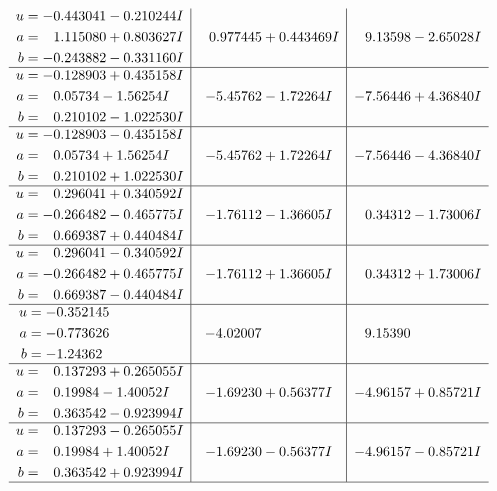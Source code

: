 \documentclass[1p]{elsarticle_modified}
\theoremstyle{definition}
\begin{document}
$$\begin{array}{c|c|c}
\begin{aligned}
u &= -0.443041 - 0.210244 I \\
a &= \phantom{-}1.115080 + 0.803627 I \\
b &= -0.243882 - 0.331160 I\end{aligned}
 & \phantom{-}0.977445 + 0.443469 I & \phantom{-}9.13598 - 2.65028 I \\ \hline\begin{aligned}
u &= -0.128903 + 0.435158 I \\
a &= \phantom{-}0.05734 - 1.56254 I \\
b &= \phantom{-}0.210102 - 1.022530 I\end{aligned}
 & -5.45762 - 1.72264 I & -7.56446 + 4.36840 I \\ \hline\begin{aligned}
u &= -0.128903 - 0.435158 I \\
a &= \phantom{-}0.05734 + 1.56254 I \\
b &= \phantom{-}0.210102 + 1.022530 I\end{aligned}
 & -5.45762 + 1.72264 I & -7.56446 - 4.36840 I \\ \hline\begin{aligned}
u &= \phantom{-}0.296041 + 0.340592 I \\
a &= -0.266482 - 0.465775 I \\
b &= \phantom{-}0.669387 + 0.440484 I\end{aligned}
 & -1.76112 - 1.36605 I & \phantom{-}0.34312 - 1.73006 I \\ \hline\begin{aligned}
u &= \phantom{-}0.296041 - 0.340592 I \\
a &= -0.266482 + 0.465775 I \\
b &= \phantom{-}0.669387 - 0.440484 I\end{aligned}
 & -1.76112 + 1.36605 I & \phantom{-}0.34312 + 1.73006 I \\ \hline\begin{aligned}
u &= -0.352145\phantom{ +0.000000I} \\
a &= -0.773626\phantom{ +0.000000I} \\
b &= -1.24362\phantom{ +0.000000I}\end{aligned}
 & -4.02007\phantom{ +0.000000I} & \phantom{-}9.15390\phantom{ +0.000000I} \\ \hline\begin{aligned}
u &= \phantom{-}0.137293 + 0.265055 I \\
a &= \phantom{-}0.19984 - 1.40052 I \\
b &= \phantom{-}0.363542 - 0.923994 I\end{aligned}
 & -1.69230 + 0.56377 I & -4.96157 + 0.85721 I \\ \hline\begin{aligned}
u &= \phantom{-}0.137293 - 0.265055 I \\
a &= \phantom{-}0.19984 + 1.40052 I \\
b &= \phantom{-}0.363542 + 0.923994 I\end{aligned}
 & -1.69230 - 0.56377 I & -4.96157 - 0.85721 I\\
 \hline 
 \end{array}$$\newpage
\end{document}
